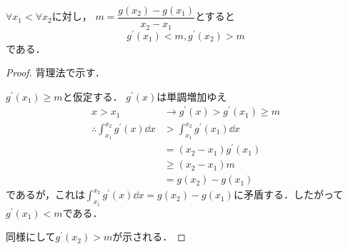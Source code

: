 \begin{enumerate}[(1)]
\begin{enumerate}[(a)]
        \begin{lemma}
            $\forall x_1<\forall x_2$に対し，
            $m=\dfrac{g(x_2)-g(x_1)}{x_2-x_1}$とすると
            \begin{equation}
                g^\prime(x_1)<m, g^\prime(x_2)>m
            \end{equation}
            である．
            \begin{proof}
                背理法で示す．

                $g^\prime(x_1)\ge m$と仮定する．
                $g^\prime(x)$は単調増加ゆえ
                \begin{align}
                    x>x_1 &\to g^\prime(x)>g^\prime(x_1)\ge m\\
                    \therefore \int^{x_2}_{x_1} g^\prime(x)\dd{x} 
                    &> \int^{x_2}_{x_1} g^\prime(x_1)\dd{x}\\
                    &= (x_2-x_1)g^\prime(x_1)\\
                    &\ge (x_2-x_1)m\\
                    &= g(x_2)-g(x_1)
                \end{align}
                であるが，これは$\displaystyle\int^{x_2}_{x_1} g^\prime(x)\dd{x} = g(x_2)-g(x_1)$に矛盾する．したがって$g^\prime(x_1)< m$である．

                同様にして$g^\prime(x_2)> m$が示される．
            \end{proof}
        \end{lemma}


\end{enumerate}
\end{enumerate}
